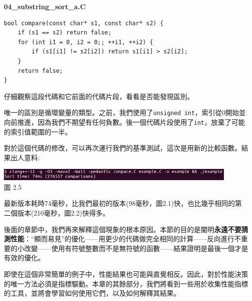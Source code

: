 \noindent
\textbf{04\_substring\_sort\_a.C}
\begin{lstlisting}[style=styleCXX]
bool compare(const char* s1, const char* s2) {
	if (s1 == s2) return false;
	for (int i1 = 0, i2 = 0;; ++i1, ++i2) {
		if (s1[i1] != s2[i2]) return s1[i1] > s2[i2];
	}
	return false;
}
\end{lstlisting}

仔細觀察這段代碼和它前面的代碼片段，看看是否能發現區別。

唯一的區別是循環變量的類型。之前，我們使用了\texttt{unsigned int}，索引從0開始並向前推進，因為我們不期望有任何負數。後一個代碼片段使用了\texttt{int}，放棄了可能的索引值範圍的一半。

對於這個代碼的修改，可以再次運行我們的基準測試，這次是用新的比較函數。結果出人意料:

\begin{center}
\includegraphics[width=0.9\textwidth]{content/1/chapter2/images/5.jpg}\\
圖 2.5
\end{center}

最新版本耗時74毫秒，比我們最初的版本(98毫秒，圖2.1)快，也比幾乎相同的第二個版本(210毫秒，圖2.2)快得多。

後面的章節中，我們再來解釋這個現象的根本原因。本節的目的是闡明\textbf{永遠不要猜測性能}：“顯而易見”的優化——用更少的代碼做完全相同的計算——反向進行不重要的小改變——使用有符號整數而不是無符號的函數——結果證明是最後一個才是有效的優化。

即使在這個非常簡單的例子中，性能結果也可能與直覺相反。因此，對於性能決策的唯一方法必須是指標驅動。本章的其餘部分，我們將看到一些用於收集性能指標的工具，並將會學習如何使用它們，以及如何解釋其結果。
